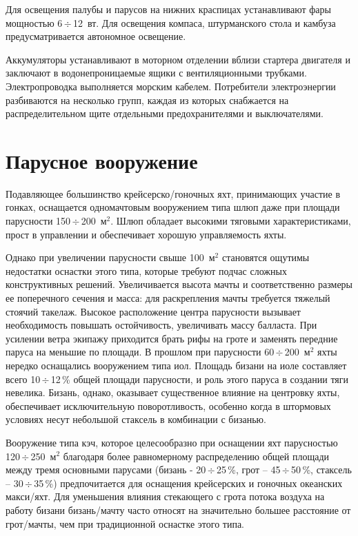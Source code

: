 \documentclass[a4paper, 12pt, twoside, final, book, russian, fittopage, cyremdash]{ncc}
\newcommand{\otdo}{\,\ensuremath{\div}\,}
\newcommand{\msq}{~м\ensuremath{^2}\xspace}
\begin{document}
Для освещения палубы и парусов на нижних краспицах устанавливают фары мощностью 6\otdo 12~вт. Для освещения компаса, штурманского стола и камбуза предусматривается автономное освещение. 

Аккумуляторы устанавливают в моторном отделении вблизи стартера двигателя и заключают в водонепроницаемые ящики с вентиляционными трубками. Электропроводка выполняется морским кабелем. Потребители электроэнергии разбиваются на несколько групп, каждая из которых снабжается на распределительном щите отдельными предохранителями и выключателями. 

\section{Парусное вооружение}

Подавляющее большинство крейсерско\-/гоночных яхт, принимающих участие в гонках, оснащается одномачтовым вооружением типа шлюп даже при площади парусности 150\otdo 200\msq. Шлюп обладает высокими тяговыми характеристиками, прост в управлении и обеспечивает хорошую управляемость яхты. 

Однако при увеличении парусности свыше 100\msq становятся ощутимы недостатки оснастки этого типа, которые требуют подчас сложных конструктивных решений. Увеличивается высота мачты и соответственно размеры ее поперечного сечения и масса: для раскрепления мачты требуется тяжелый стоячий такелаж. Высокое расположение центра парусности вызывает необходимость повышать остойчивость, увеличивать массу балласта. При усилении ветра экипажу приходится брать рифы на гроте и заменять передние паруса на меньшие по площади. В прошлом при парусности 60\otdo 200\msq яхты нередко оснащались вооружением типа иол. Площадь бизани на иоле составляет всего 10\otdo 12\,\% общей площади парусности, и роль этого паруса в создании тяги невелика. Бизань, однако, оказывает существенное влияние на центровку яхты, обеспечивает исключительную поворотливость, особенно когда в штормовых условиях несут небольшой стаксель в комбинации с бизанью. 

Вооружение типа кэч, которое целесообразно при оснащении яхт парусностью 120\otdo 250\msq благодаря более равномерному распределению общей площади между тремя основными парусами (бизань \-- 20\otdo 25\,\%, грот \--- 45\otdo 50\,\%, стаксель \--- 30\otdo 35\,\%) предпочитается для оснащения крейсерских и гоночных океанских макси\-/яхт. Для уменьшения влияния стекающего с грота потока воздуха на работу бизани бизань\-/мачту часто относят на значительно большее расстояние от грот\-/мачты, чем при традиционной оснастке этого типа.
\end{document}
